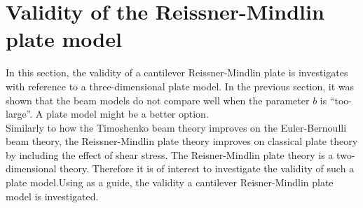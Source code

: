 \documentclass[../../main.tex]{subfiles}
\begin{document}
\section{Validity of the Reissner-Mindlin plate model}
In this section, the validity of a cantilever Reissner-Mindlin plate is investigates with reference to a three-dimensional plate model. In the previous section, it was shown that the beam models do not compare well when the parameter $b$ is ``too-large''. A plate model might be a better option.\\

Similarly to how the Timoshenko beam theory improves on the Euler-Bernoulli beam theory, the Reissner-Mindlin plate theory improves on classical plate theory by including the effect of shear stress. The Reisner-Mindlin plate theory is a two-dimensional theory. Therefore it is of interest to investigate the validity of such a plate model.Using \cite{LVV09} as a guide, the validity a cantilever Reisner-Mindlin plate model is investigated.\\
\end{document}
